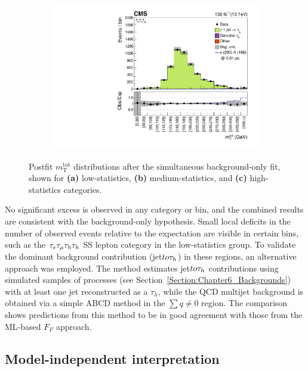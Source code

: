 \begin{figure}[!htbp]
\begin{subfigure}[b]{0.49\textwidth}
            \centering
            \includegraphics[width=\textwidth]{Figures/Chapter6/postfit_plots_combined_postfit_high_stat_paper.pdf}
            \caption{}
        \end{subfigure}

    \caption[Postfit $m_\mathrm{T}^\mathrm{tot}$ distributions in low-, medium-, and high-statistics categories.]{Postfit $m_\mathrm{T}^\mathrm{tot}$ distributions after the simultaneous background-only fit, shown for \textbf{(a)} low-statistics, \textbf{(b)} medium-statistics, and \textbf{(c)} high-statistics categories.}

    \label{Figure:Chapter6_PostfitDistributions}
\end{figure}

No significant excess is observed in any category or bin, and the combined results are consistent with the background-only hypothesis. Small local deficits in the number of observed events relative to the expectation are visible in certain bins, such as the $\tau_e\tau_\mu\tau_h\tau_h$ SS lepton category in the low-statistics group. To validate the dominant background contribution (jet$to\tau_h$) in these regions, an alternative approach was employed. The method estimates jet$to\tau_h$ contributions using simulated samples of processes (see Section~\ref{Section:Chapter6_Backgrounds}) with at least one jet reconstructed as a $\tau_{h}$, while the \ac{QCD} multijet background is obtained via a simple ABCD method in the $\sum q \neq 0$ region. The comparison shows predictions from this method to be in good agreement with those from the \ac{ML}-based $F_F$ approach.

\newpage
\subsection{Model-independent interpretation}

